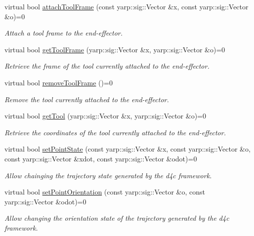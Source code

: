 \begin{DoxyCompactItemize}
virtual bool \hyperlink{classiCub_1_1d4c_1_1D4C_af2423c24c50073666982ce93bb1c9312}{attach\+Tool\+Frame} (const yarp\+::sig\+::\+Vector \&x, const yarp\+::sig\+::\+Vector \&o)=0
\begin{DoxyCompactList}\small\item\em Attach a tool frame to the end-\/effector. \end{DoxyCompactList}\item 
virtual bool \hyperlink{classiCub_1_1d4c_1_1D4C_a0d20b0cba2b361c0e8d05e9f8e5c917a}{get\+Tool\+Frame} (yarp\+::sig\+::\+Vector \&x, yarp\+::sig\+::\+Vector \&o)=0
\begin{DoxyCompactList}\small\item\em Retrieve the frame of the tool currently attached to the end-\/effector. \end{DoxyCompactList}\item 
virtual bool \hyperlink{classiCub_1_1d4c_1_1D4C_a7129985803f69bd51fbb1368bd5f9f60}{remove\+Tool\+Frame} ()=0
\begin{DoxyCompactList}\small\item\em Remove the tool currently attached to the end-\/effector. \end{DoxyCompactList}\item 
virtual bool \hyperlink{classiCub_1_1d4c_1_1D4C_a2ff9c69ba856930358efaa35cfa64585}{get\+Tool} (yarp\+::sig\+::\+Vector \&x, yarp\+::sig\+::\+Vector \&o)=0
\begin{DoxyCompactList}\small\item\em Retrieve the coordinates of the tool currently attached to the end-\/effector. \end{DoxyCompactList}\item 
virtual bool \hyperlink{classiCub_1_1d4c_1_1D4C_a5ab471d083e50b057f6926bccfcc5593}{set\+Point\+State} (const yarp\+::sig\+::\+Vector \&x, const yarp\+::sig\+::\+Vector \&o, const yarp\+::sig\+::\+Vector \&xdot, const yarp\+::sig\+::\+Vector \&odot)=0
\begin{DoxyCompactList}\small\item\em Allow chainging the trajectory state generated by the d4c framework. \end{DoxyCompactList}\item 
virtual bool \hyperlink{classiCub_1_1d4c_1_1D4C_a1d5d93db7189eb3949297b3937f4ef90}{set\+Point\+Orientation} (const yarp\+::sig\+::\+Vector \&o, const yarp\+::sig\+::\+Vector \&odot)=0
\begin{DoxyCompactList}\small\item\em Allow changing the orientation state of the trajectory generated by the d4c framework. \end{DoxyCompactList}\item 

\end{DoxyCompactItemize}
